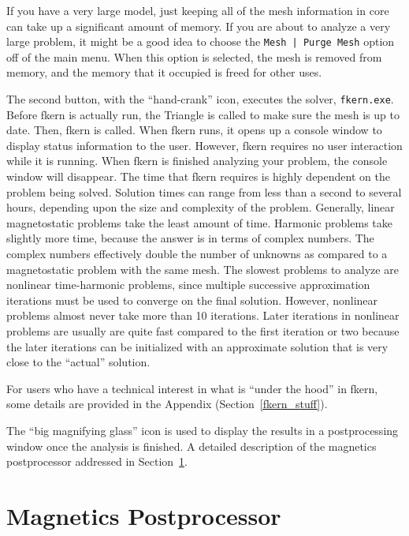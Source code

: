 \documentclass[12pt]{report}
\begin{document}
If you have a very large model, just keeping all of the mesh
information in core can take up a significant amount of memory.  If
you are about to analyze a very large problem, it might be a good
idea to choose the \verb+Mesh | Purge Mesh+ option off of the main
menu.  When this option is selected, the mesh is removed from
memory, and the memory that it occupied is freed for other uses.

The second button, with the ``hand-crank'' icon, executes the
solver, {\tt fkern.exe}. Before fkern is actually run, the Triangle
is called to make sure the mesh is up to date. Then, fkern is
called. When fkern runs, it opens up a console window to display
status information to the user. However, fkern requires no user
interaction while it is running. When fkern is finished analyzing
your problem, the console window will disappear. The time that
fkern requires is highly dependent on the problem being solved.
Solution times can range from less than a second to several hours,
depending upon the size and complexity of the problem. Generally,
linear magnetostatic problems take the least amount of time.
Harmonic problems take slightly more time, because the answer is in
terms of complex numbers. The complex numbers effectively double
the number of unknowns as compared to a magnetostatic problem with
the same mesh. The slowest problems to analyze are nonlinear
time-harmonic problems, since multiple successive approximation
iterations must be used to converge on the final solution. However,
nonlinear problems almost never take more than 10 iterations. Later
iterations in nonlinear problems are usually are quite fast
compared to the first iteration or two because the later iterations
can be initialized with an approximate solution that is very close
to the ``actual'' solution.

For users who have a technical interest in what is ``under the
hood'' in fkern, some details are provided in the Appendix
(Section~\ref{fkern_stuff}).

The ``big magnifying glass'' icon is used to display the results in
a postprocessing window once the analysis is finished.  A detailed
description of the magnetics postprocessor addressed in
Section~\ref{ppsec}.

\section{Magnetics Postprocessor} \label{ppsec}
\end{document}
